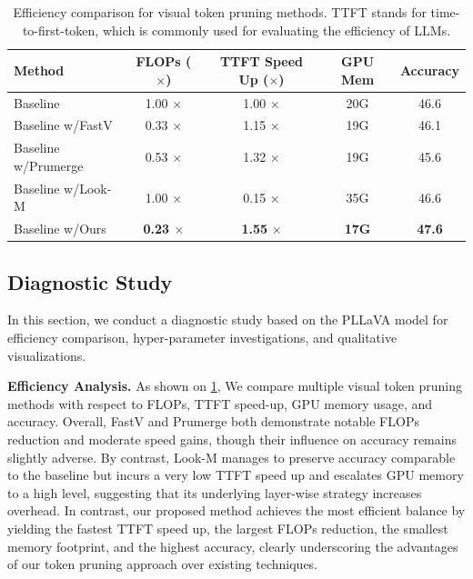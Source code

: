 \documentclass{article} %
\begin{document}
\begin{table}[t]
\caption{Efficiency comparison for visual token pruning methods. TTFT stands for time-to-first-token, which is commonly used for evaluating the efficiency of LLMs.}
    \centering
    \footnotesize
    \begin{tabular}{l|c|c|c|c}
        \toprule
        \textbf{Method} & \textbf{FLOPs ($\times$)} & \textbf{TTFT Speed Up ($\times$)} & \textbf{GPU Mem} & \textbf{Accuracy} \\
        \midrule
        Baseline & 1.00 $\times$ & 1.00 $\times$ & 20G & 46.6 \\
        Baseline w/FastV & 0.33 $\times$ & 1.15 $\times$ & 19G & 46.1 \\
        Baseline w/Prumerge & 0.53 $\times$ & 1.32 $\times$ & 19G & 45.6 \\
        Baseline w/Look-M & 1.00 $\times$ & 0.15 $\times$ & 35G & 46.6 \\
        Baseline w/Ours & \textbf{0.23 $\times$} & \textbf{1.55} $\times$ & \textbf{17G} & \textbf{47.6} \\
        \bottomrule
    \end{tabular}
\label{tab:efficiency_comparison}
\end{table}


\subsection{Diagnostic Study}
\label{sec:disagnostic}
In this section, we conduct a diagnostic study based on the PLLaVA model for efficiency comparison, hyper-parameter investigations, and qualitative visualizations.

\textbf{Efficiency Analysis.} As shown on \cref{tab:efficiency_comparison}, We compare multiple visual token pruning methods with respect to FLOPs, TTFT speed-up, GPU memory usage, and accuracy. Overall, FastV and Prumerge both demonstrate notable FLOPs reduction and moderate speed gains, though their influence on accuracy remains slightly adverse. By contrast, Look-M manages to preserve accuracy comparable to the baseline but incurs a very low TTFT speed up and escalates GPU memory to a high level, suggesting that its underlying layer-wise strategy increases overhead. In contrast, our proposed method achieves the most efficient balance by yielding the fastest TTFT speed up, the largest FLOPs reduction, the smallest memory footprint, and the highest accuracy, clearly underscoring the advantages of our token pruning approach over existing techniques.
\end{document}

